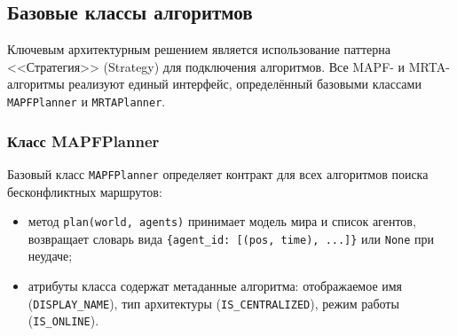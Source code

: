 \subsection{Базовые классы алгоритмов}

Ключевым архитектурным решением является использование паттерна <<Стратегия>> (Strategy) для подключения алгоритмов. Все MAPF- и MRTA-алгоритмы реализуют единый интерфейс, определённый базовыми классами \texttt{MAPFPlanner} и \texttt{MRTAPlanner}.

\subsubsection{Класс MAPFPlanner}

Базовый класс \texttt{MAPFPlanner} определяет контракт для всех алгоритмов поиска бесконфликтных маршрутов:

\begin{itemize}
    \item метод \texttt{plan(world, agents)} принимает модель мира и список агентов, возвращает словарь вида \texttt{\{agent\_id: [(pos, time), ...]\}} или \texttt{None} при неудаче;
    \item атрибуты класса содержат метаданные алгоритма: отображаемое имя (\texttt{DISPLAY\_NAME}), тип архитектуры (\texttt{IS\_CENTRALIZED}), режим работы (\texttt{IS\_ONLINE}).
\end{itemize}

